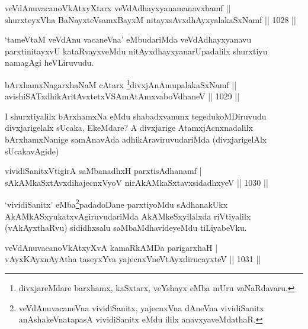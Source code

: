 
\begin{shl}
veVdAnuvacanoVkAtxyX\s tarx veVdAdhayxyanamanavxhamf || \\
shurxteyxVha BaNayxteV\s samxBayxM nitayxsAvxdhAyxyalakaSxNamf \hfill || 1028 ||  
\end{shl}

\begin{artha}
`tameVtaM veVdAnu vacaneVna' eMbudariMda veVdAdhayxyanavu parxtinitayxvU kataRvayxveMdu nitAyxdhayxyanarUpadalilx shurxtiyu namagAgi heVLiruvudu.
\end{artha}


\begin{shl}
bArxhamxNagarxhaNaM cAtarx \footnote{divxjareMdare barxhamx, kaSxtarx, veYshayx eMba mUru vaNaRdavaru.}divxjAnAmupalakaSxNamf || \\
avishiSATxdhikAritAvxtetxVSAmAtAmxvaboVdhaneV \hfill || 1029 ||  
\end{shl}

\begin{artha}
I shurxtiyalilx bArxhamxNa eMdu shabadxvanunx tegedukoMDiruvudu divxjarigelalx sUcaka, EkeMdare? A divxjarige AtamxjAcnxnadalilx bArxhamxNanige samAnavAda adhikAraviruvudariMda (divxjarigelAlx sUcakavAgide)
\end{artha}


\begin{shl}
vividiSanitxVtigirA saMbanadhxH parxtisAdhanamf |\\
sAkAMkaSxtAvxdihajecnxVyoV nirAkAMkaSxtavxsidadhxyeV \hfill || 1030 ||
\end{shl}

\begin{artha}
`vividiSanitx' eMba\footnote{veVdAnuvacaneVna vividiSanitx, yajecnxVna dAneVna vividiSanitx anAshakeVnatapasA vividiSanitx eMdu ililx anavxyaveMdathaR.}padadoDane parxtiyoMdu sAdhanakUkx AkAMkASxyukatxvAgiruvudariMda AkAMkeSxyilalxda riVtiyalilx (vAkAyxthaRvu) sididhxsalu saMbaMdhavideyeMdu tiLiyabeVku.
\end{artha}


\begin{shl}
veVdAnuvacanoVkAtxyXvA kamaRkAMDa parigarxhaH |\\
vAyxKAyxnAyAtha taseyxYva yajecnxVneVtAyxdirucayxteV \hfill || 1031 ||
\end{shl}

